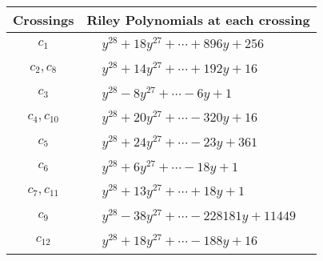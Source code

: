 \documentclass[1p]{elsarticle_modified}
\theoremstyle{definition}
\begin{document}
\begin{tabular}{m{50pt}|m{274pt}}
Crossings & \hspace{64pt}Riley Polynomials at each crossing \\
\hline $$\begin{aligned}c_{1}\end{aligned}$$&$\begin{aligned}
&y^{28}+18 y^{27}+\cdots+896 y+256
\end{aligned}$\\
\hline $$\begin{aligned}c_{2},c_{8}\end{aligned}$$&$\begin{aligned}
&y^{28}+14 y^{27}+\cdots+192 y+16
\end{aligned}$\\
\hline $$\begin{aligned}c_{3}\end{aligned}$$&$\begin{aligned}
&y^{28}-8 y^{27}+\cdots-6 y+1
\end{aligned}$\\
\hline $$\begin{aligned}c_{4},c_{10}\end{aligned}$$&$\begin{aligned}
&y^{28}+20 y^{27}+\cdots-320 y+16
\end{aligned}$\\
\hline $$\begin{aligned}c_{5}\end{aligned}$$&$\begin{aligned}
&y^{28}+24 y^{27}+\cdots-23 y+361
\end{aligned}$\\
\hline $$\begin{aligned}c_{6}\end{aligned}$$&$\begin{aligned}
&y^{28}+6 y^{27}+\cdots-18 y+1
\end{aligned}$\\
\hline $$\begin{aligned}c_{7},c_{11}\end{aligned}$$&$\begin{aligned}
&y^{28}+13 y^{27}+\cdots+18 y+1
\end{aligned}$\\
\hline $$\begin{aligned}c_{9}\end{aligned}$$&$\begin{aligned}
&y^{28}-38 y^{27}+\cdots-228181 y+11449
\end{aligned}$\\
\hline $$\begin{aligned}c_{12}\end{aligned}$$&$\begin{aligned}
&y^{28}+18 y^{27}+\cdots-188 y+16
\end{aligned}$\\
\hline
\end{tabular}\\~\\
\end{document}
